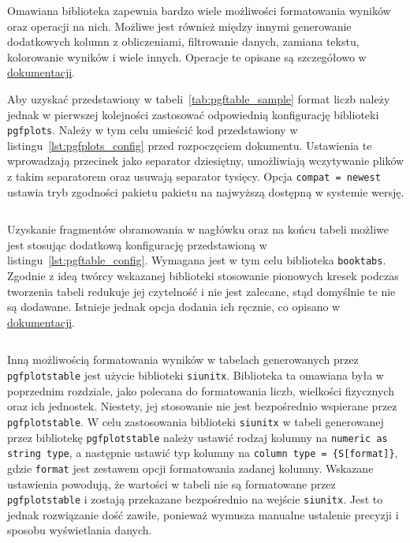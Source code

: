 Omawiana biblioteka zapewnia bardzo wiele możliwości formatowania wyników oraz operacji na nich. Możliwe jest również między innymi generowanie dodatkowych kolumn z obliczeniami, filtrowanie danych, zamiana tekstu, kolorowanie wyników i wiele innych. Operacje te opisane są szczegółowo w \href{https://pgfplots.sourceforge.net/pgfplotstable.pdf}{dokumentacji}.

Aby uzyskać przedstawiony w tabeli~\ref{tab:pgftable_sample} format liczb należy jednak w pierwszej kolejności zastosować odpowiednią konfigurację biblioteki \texttt{pgfplots}. Należy w tym celu umieścić kod przedstawiony w listingu~\ref{lst:pgfplots_config} przed rozpoczęciem dokumentu. Ustawienia te wprowadzają przecinek jako separator dziesiętny, umożliwiają wczytywanie plików z takim separatorem oraz usuwają separator tysięcy. Opcja \verb|compat = newest| ustawia tryb zgodności pakietu pakietu na najwyższą dostępną w systemie wersję.

\begin{listing}[htb]
\inputminted{latex}{skrypty/pgfplots_config.tex}
\end{listing}

Uzyskanie fragmentów obramowania w nagłówku oraz na końcu tabeli możliwe jest stosując dodatkową konfigurację przedstawioną w listingu~\ref{lst:pgftable_config}. Wymagana jest w tym celu biblioteka \texttt{booktabs}. Zgodnie z ideą twórcy wskazanej biblioteki stosowanie pionowych kresek podczas tworzenia tabeli redukuje jej czytelność i nie jest zalecane, stąd domyślnie te nie są dodawane. Istnieje jednak opcja dodania ich ręcznie, co opisano w \href{https://pgfplots.sourceforge.net/pgfplotstable.pdf}{dokumentacji}. 

\begin{listing}[htb]
\inputminted{latex}{skrypty/pgftable_config.tex}
\end{listing}

Inną możliwością formatowania wyników w tabelach generowanych przez \texttt{pgfplotstable} jest użycie biblioteki \texttt{siunitx}. Biblioteka ta omawiana była w poprzednim rozdziale, jako polecana do formatowania liczb, wielkości fizycznych oraz ich jednostek. Niestety, jej stosowanie nie jest bezpośrednio wspierane przez \texttt{pgfplotstable}. W celu zastosowania biblioteki \texttt{siunitx} w tabeli generowanej przez bibliotekę \texttt{pgfplotstable} należy ustawić rodzaj kolumny na \verb|numeric as string type|, a następnie ustawić typ kolumny na \verb|column type = {S[format]}|, gdzie \verb|format| jest zestawem opcji formatowania zadanej kolumny. Wskazane ustawienia powodują, że wartości w tabeli nie są formatowane przez \texttt{pgfplotstable} i zostają przekazane bezpośrednio na wejście \texttt{siunitx}. Jest to jednak rozwiązanie dość zawiłe, ponieważ wymusza manualne ustalenie precyzji i sposobu wyświetlania danych.

